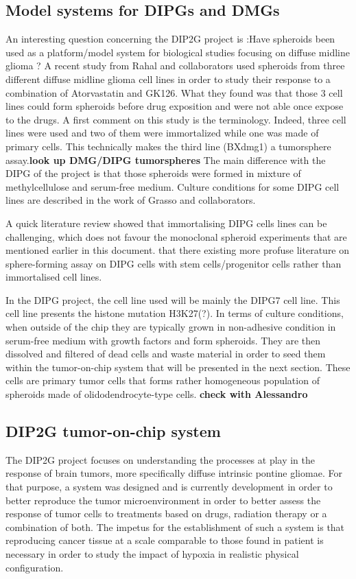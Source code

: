 \documentclass[11pt,a4paper]{article}
\begin{document}
\subsection{Model systems for DIPGs and DMGs}
An interesting question concerning the DIP2G project is :Have spheroids been used as a platform/model system for biological studies focusing on diffuse midline glioma ? A recent study from Rahal and collaborators used spheroids from three different diffuse midline glioma cell lines in order to study their response to a combination of Atorvastatin and GK126.\cite{Rahal2022} What they found was that those 3 cell lines could form spheroids before drug exposition and were not able once expose to the drugs. A first comment on this study is the terminology. Indeed, three cell lines were used and two of them were immortalized while one was made of primary cells. This technically makes the third line (BXdmg1) a tumorsphere assay.\textbf{look up DMG/DIPG tumorspheres} The main difference with the DIPG of the project is that those spheroids were formed in mixture of methylcellulose and serum-free medium. Culture conditions for some DIPG cell lines are described in the work of Grasso and collaborators. \cite{Grasso2015}%

A quick literature review showed that immortalising DIPG cells lines can be challenging, which does not favour the monoclonal spheroid experiments that are mentioned earlier in this document.\cite{Sun2019}\cite{Meel2018} that there existing more profuse literature on sphere-forming assay on DIPG cells with stem cells/progenitor cells rather than immortalised cell lines.

In the DIPG project, the cell line used will be mainly the DIPG7 cell line. This cell line presents the histone mutation H3K27(?). In terms of culture conditions, when outside of the chip they are typically grown in non-adhesive condition in serum-free medium with growth factors and form spheroids. They are then dissolved and filtered of dead cells and waste material in order to seed them within the tumor-on-chip system that will be presented in the next section. These cells are primary tumor cells that forms rather homogeneous population of spheroids made of olidodendrocyte-type cells. \textbf{check with Alessandro} 

\subsection{DIP2G tumor-on-chip system}
The DIP2G project focuses on understanding the processes at play in the response of brain tumors, more specifically diffuse intrinsic pontine gliomae. For that purpose, a system was designed and is currently development in order to better reproduce the tumor microenvironment in order to better assess the response of tumor cells to treatments based on drugs, radiation therapy or a combination of both. The impetus for the establishment of such a system is that reproducing cancer tissue at a scale comparable to those found in patient is necessary in order to study the impact of hypoxia in realistic physical configuration.
\end{document}
